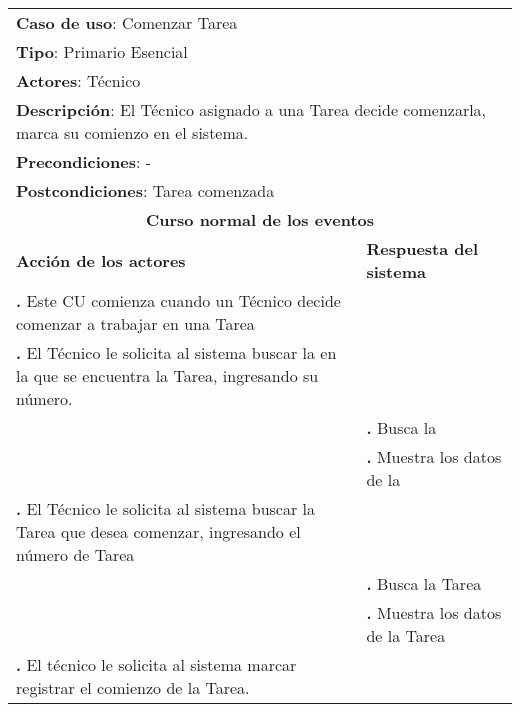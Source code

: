 \documentclass[12pt]{extarticle}
\begin{document}
    \newcommand\inc{\stepcounter{step}\textbf{\thestep. }}
    \newcommand\resetinc{\setcounter{step}{0}}
    \newcommand\raya{\noindent\rule{169mm}{0.8mm}\\}


	\begin{longtable}{ |p{8cm}|p{8cm}| }
		\hline
		\multicolumn{2}{|p{16cm}|}{\textbf{Caso de uso}: Comenzar Tarea}\\
		\multicolumn{2}{|p{16cm}|}{\textbf{Tipo}: Primario Esencial}\\
		\multicolumn{2}{|p{16cm}|}{\textbf{Actores}: Técnico}\\
		\multicolumn{2}{|p{16cm}|}{\textbf{Descripción}: El Técnico asignado a una Tarea decide comenzarla, marca su comienzo en el sistema.}\\
		\multicolumn{2}{|p{16cm}|}{\textbf{Precondiciones}: -}\\
		\multicolumn{2}{|p{16cm}|}{\textbf{Postcondiciones}: Tarea comenzada}\\
		\hline
		\multicolumn{2}{|c|}{\textbf{Curso normal de los eventos}}\\
		\hline
		\textbf{Acción de los actores} & \textbf{Respuesta del sistema}\\
		\hline

			\inc Este CU comienza cuando un Técnico decide comenzar a trabajar en una Tarea& \\
			\hline
            \inc El Técnico le solicita al sistema buscar la \OT{} en la que se encuentra la Tarea, ingresando su número.& \\
			\hline
            & \inc Busca la \OT{}\\
			\hline
			& \inc Muestra los datos de la \OT{}\\
			\hlineo


			\inc El Técnico le solicita al sistema buscar la Tarea que desea comenzar, ingresando el número de Tarea& \\
			\hline
			& \inc Busca la Tarea\\
			\hline
			& \inc Muestra los datos de la Tarea\\
			\hline
            \inc El técnico le solicita al sistema marcar registrar el comienzo de la Tarea.&\\
			\hline



\end{longtable}
\end{document}
